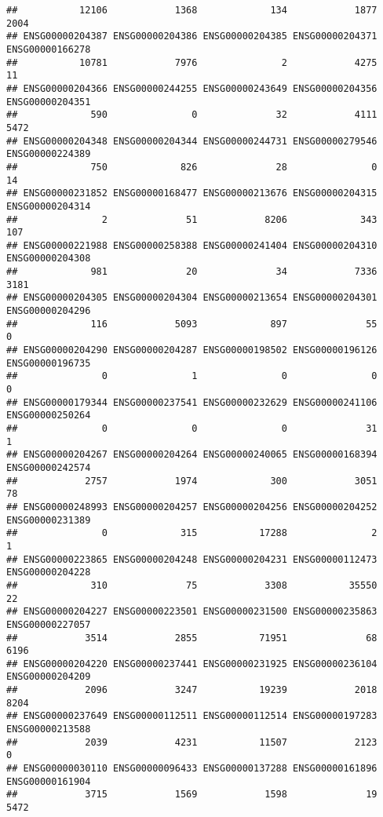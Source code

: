 \documentclass[
]{article}
\begin{document}
\begin{verbatim}
##           12106            1368             134            1877            2004 
## ENSG00000204387 ENSG00000204386 ENSG00000204385 ENSG00000204371 ENSG00000166278 
##           10781            7976               2            4275              11 
## ENSG00000204366 ENSG00000244255 ENSG00000243649 ENSG00000204356 ENSG00000204351 
##             590               0              32            4111            5472 
## ENSG00000204348 ENSG00000204344 ENSG00000244731 ENSG00000279546 ENSG00000224389 
##             750             826              28               0              14 
## ENSG00000231852 ENSG00000168477 ENSG00000213676 ENSG00000204315 ENSG00000204314 
##               2              51            8206             343             107 
## ENSG00000221988 ENSG00000258388 ENSG00000241404 ENSG00000204310 ENSG00000204308 
##             981              20              34            7336            3181 
## ENSG00000204305 ENSG00000204304 ENSG00000213654 ENSG00000204301 ENSG00000204296 
##             116            5093             897              55               0 
## ENSG00000204290 ENSG00000204287 ENSG00000198502 ENSG00000196126 ENSG00000196735 
##               0               1               0               0               0 
## ENSG00000179344 ENSG00000237541 ENSG00000232629 ENSG00000241106 ENSG00000250264 
##               0               0               0              31               1 
## ENSG00000204267 ENSG00000204264 ENSG00000240065 ENSG00000168394 ENSG00000242574 
##            2757            1974             300            3051              78 
## ENSG00000248993 ENSG00000204257 ENSG00000204256 ENSG00000204252 ENSG00000231389 
##               0             315           17288               2               1 
## ENSG00000223865 ENSG00000204248 ENSG00000204231 ENSG00000112473 ENSG00000204228 
##             310              75            3308           35550              22 
## ENSG00000204227 ENSG00000223501 ENSG00000231500 ENSG00000235863 ENSG00000227057 
##            3514            2855           71951              68            6196 
## ENSG00000204220 ENSG00000237441 ENSG00000231925 ENSG00000236104 ENSG00000204209 
##            2096            3247           19239            2018            8204 
## ENSG00000237649 ENSG00000112511 ENSG00000112514 ENSG00000197283 ENSG00000213588 
##            2039            4231           11507            2123               0 
## ENSG00000030110 ENSG00000096433 ENSG00000137288 ENSG00000161896 ENSG00000161904 
##            3715            1569            1598              19            5472 

\end{verbatim}
\end{document}
